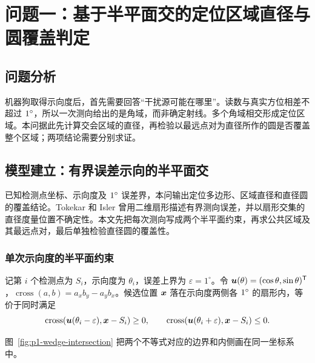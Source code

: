 \section{问题一：基于半平面交的定位区域直径与圆覆盖判定}

\subsection{问题分析}

机器狗取得示向度后，首先需要回答“干扰源可能在哪里”。读数与真实方位相差不超过 \(1^{\circ}\)，所以一次测向给出的是角域，而非确定射线。多个角域相交形成定位区域。本问据此先计算交会区域的直径，再检验以最远点对为直径所作的圆是否覆盖整个区域；两项结论需要分别求证。

\subsection{模型建立：有界误差示向的半平面交}

已知检测点坐标、示向度及 \(1^{\circ}\) 误差界，本问输出定位多边形、区域直径和直径圆的覆盖结论。Tokekar 和 Isler 曾用二维扇形描述有界测向误差，并以扇形交集的直径度量位置不确定性\cite{tokekar2013bearing}。本文先把每次测向写成两个半平面约束，再求公共区域及其最远点对，最后单独检验直径圆的覆盖性。

\subsubsection{单次示向度的半平面约束}

记第 \(i\) 个检测点为 \(S_i\)，示向度为 \(\theta_i\)，误差上界为 \(\varepsilon=1^{\circ}\)。令 \(\bm{u}(\theta)=(\cos\theta,\sin\theta)^{\mathsf T}\)，\(\operatorname{cross}(a,b)=a_xb_y-a_yb_x\)。候选位置 \(\bm{x}\) 落在示向度两侧各 \(1^{\circ}\) 的扇形内，等价于同时满足
\begin{equation}
  \operatorname{cross}\!\left(
  \bm{u}(\theta_i-\varepsilon),\bm{x}-S_i
  \right)\ge0,\qquad
  \operatorname{cross}\!\left(
  \bm{u}(\theta_i+\varepsilon),\bm{x}-S_i
  \right)\le0.
  \label{eq:p1-wedge-cross}
\end{equation}

图~\ref{fig:p1-wedge-intersection} 把两个不等式对应的边界和内侧画在同一坐标系中。


